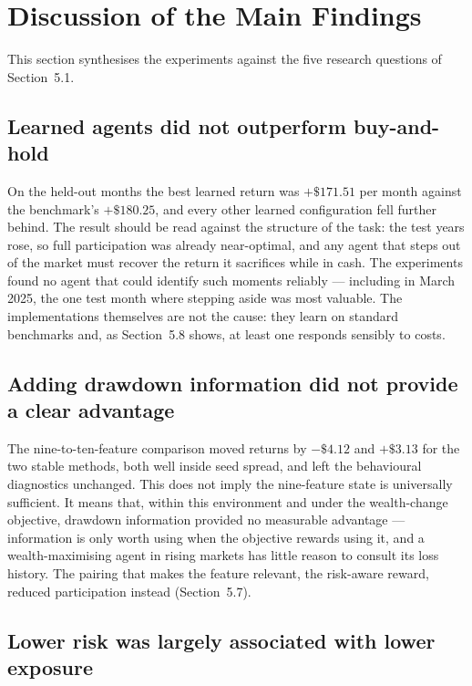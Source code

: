 \section{Discussion of the Main Findings}

This section synthesises the experiments against the five research
questions of Section~5.1.

\subsection{Learned agents did not outperform buy-and-hold}

On the held-out months the best learned return was $+\$171.51$ per month
against the benchmark's $+\$180.25$, and every other learned configuration
fell further behind. The result should be read against the structure of
the task: the test years rose, so full participation was already
near-optimal, and any agent that steps out of the market must recover the
return it sacrifices while in cash. The experiments found no agent that
could identify such moments reliably --- including in March 2025, the one
test month where stepping aside was most valuable. The implementations
themselves are not the cause: they learn on standard benchmarks and, as
Section~5.8 shows, at least one responds sensibly to costs.

\subsection{Adding drawdown information did not provide a clear advantage}

The nine-to-ten-feature comparison moved returns by $-\$4.12$ and
$+\$3.13$ for the two stable methods, both well inside seed spread, and
left the behavioural diagnostics unchanged. This does not imply the
nine-feature state is universally sufficient. It means that, within this
environment and under the wealth-change objective, drawdown information
provided no measurable advantage --- information is only worth using when
the objective rewards using it, and a wealth-maximising agent in rising
markets has little reason to consult its loss history. The pairing that
makes the feature relevant, the risk-aware reward, reduced participation
instead (Section~5.7).

\subsection{Lower risk was largely associated with lower exposure}

